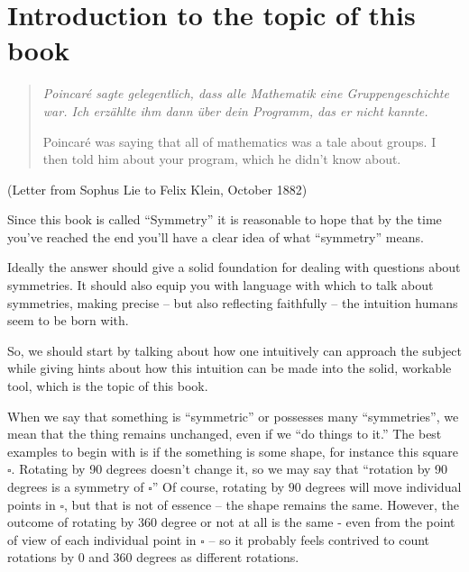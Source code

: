 \chapter{Introduction to the topic of this book}
\label{ch:intro}

\begin{quote}
  \itshape \foreignlanguage{ngerman}{Poincar\'e sagte gelegentlich,
  dass alle Mathematik eine Gruppengeschichte war.
  Ich erz\"ahlte ihm dann \"uber dein Programm,
  das er nicht kannte.}

  \smallskip

  \noindent Poincar\'e was saying
  that all of mathematics was a tale about groups.
  I then told him about your program,
  which he didn't know about.
\end{quote}
\hfill (Letter from Sophus Lie to Felix Klein, October 1882)

\bigskip



Since this book is called ``Symmetry'' it is reasonable to hope
that by the time you've reached the end you'll have a clear idea of
what ``symmetry'' means.

Ideally the answer should give a solid foundation for dealing with
questions about symmetries. It should also equip you with language
with which to talk about symmetries, making precise -- but also
reflecting faithfully -- the intuition humans seem to be born with.

So, we should start by talking about how one intuitively can approach the
subject while giving hints about how this intuition can be made into
the solid, workable tool, which is the topic  of this book.


When we say that something is ``symmetric'' or possesses many ``symmetries'',
we mean that the thing remains unchanged, even if we ``do things to it.''
The best examples to begin with is if the something is some shape, for
instance this square $\square$. Rotating by 90 degrees doesn’t change it, so we may say that ``rotation by 90 degrees is a symmetry of $\square$''
Of course, rotating by $90$ degrees will move individual points in $\square$, but that
is not of essence -- the shape remains the same.
However, the outcome of rotating by $360$ degree or not at all
is the same - even from the point of view of each individual point in $\square$ -- so it probably feels contrived to count rotations by $0$ and $360$ degrees as different rotations.

